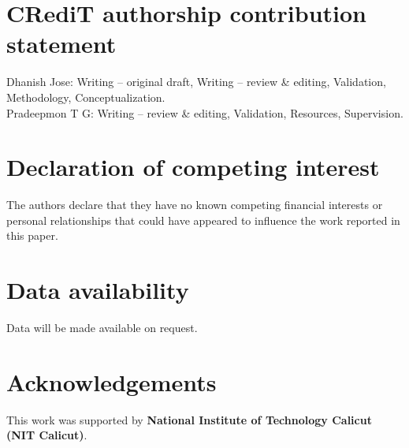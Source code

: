 \documentclass[manuscript,screen]{acmart}
\begin{document}
	\section*{CRediT authorship contribution statement}
	Dhanish Jose: Writing – original draft, Writing – review \& editing, Validation, Methodology, Conceptualization.\\
	Pradeepmon T G: Writing – review \& editing, Validation, Resources, Supervision.
	
	
	\section*{Declaration of competing interest}
	The authors declare that they have no known competing financial interests or personal relationships 
	that could have appeared to influence the work reported in this paper.
	
	\section*{Data availability}
	Data will be made available on request.
	
	\section*{Acknowledgements}
	This work was supported by \textbf{National Institute of Technology Calicut (NIT Calicut)}.
	
	
	\appendix
	

	
	
	
	
\end{document}
